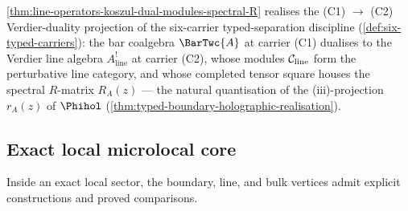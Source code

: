 \begin{remark}%
\label{rem:line-operators-as-C2-of-Phihol}%
%
\cref{thm:line-operators-koszul-dual-modules-spectral-R} realises the
\textup{(C1)} $\to$ \textup{(C2)} Verdier-duality projection of the
six-carrier typed-separation discipline
(\cref{def:six-typed-carriers}): the bar coalgebra $\BarTwc{A}$ at
carrier \textup{(C1)} dualises to the Verdier line algebra
$A^{!}_{\mathrm{line}}$ at carrier \textup{(C2)}, whose modules
$\mathcal C_{\mathrm{line}}$ form the perturbative line category, and whose
completed tensor square houses the spectral $R$-matrix $R_{A}(z)$ ---
the natural quantisation of the (iii)-projection $r_{A}(z)$ of
$\Phihol$ (\cref{thm:typed-boundary-holographic-realisation}).
\end{remark}

\subsection{Exact local microlocal core}

Inside an exact local sector, the boundary, line, and bulk vertices
admit explicit constructions and proved comparisons.

